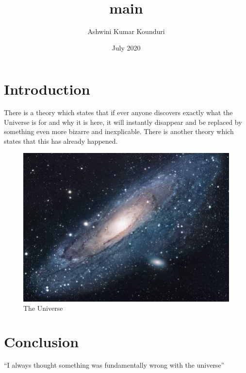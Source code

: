 \documentclass{article}
\title{main}
\author{Ashwini Kumar Kounduri}
\date{July 2020}
\begin{document}
    \maketitle


    \section{Introduction}
    There is a theory which states that if ever anyone discovers exactly what the Universe is for and why it is here, it will instantly disappear and be replaced by something even more bizarre and inexplicable.
    There is another theory which states that this has already happened.

    \begin{figure}[h!]
        \centering
        \includegraphics[scale=1.7]{universe}
        \caption{The Universe}
        \label{fig:universe}
    \end{figure}


    \section{Conclusion}
    ``I always thought something was fundamentally wrong with the universe'' \citep{adams1995hitchhiker}

    
    
\end{document}
